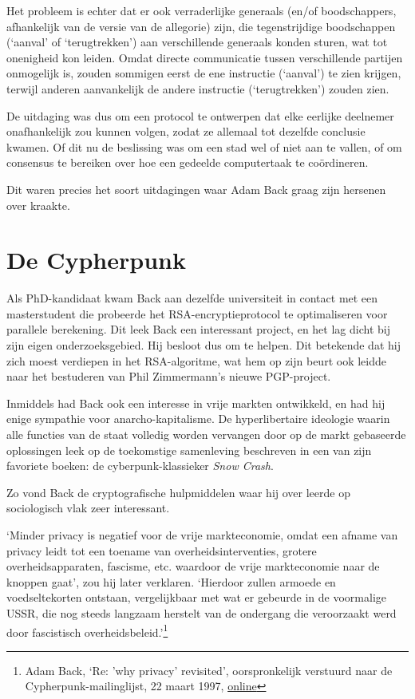 \documentclass[
  a5paper,
  smalldemyvopaper,11pt,twoside,onecolumn,openright,extrafontsizes]{memoir}
\begin{document}
Het probleem is echter dat er ook verraderlijke generaals (en/of
boodschappers, afhankelijk van de versie van de allegorie) zijn, die
tegenstrijdige boodschappen (`aanval' of `terugtrekken') aan
verschillende generaals konden sturen, wat tot onenigheid kon leiden.
Omdat directe communicatie tussen verschillende partijen onmogelijk is,
zouden sommigen eerst de ene instructie (`aanval') te zien krijgen,
terwijl anderen aanvankelijk de andere instructie (`terugtrekken')
zouden zien.

De uitdaging was dus om een protocol te ontwerpen dat elke eerlijke
deelnemer onafhankelijk zou kunnen volgen, zodat ze allemaal tot
dezelfde conclusie kwamen. Of dit nu de beslissing was om een stad wel
of niet aan te vallen, of om consensus te bereiken over hoe een gedeelde
computertaak te coördineren.

Dit waren precies het soort uitdagingen waar Adam Back graag zijn
hersenen over kraakte.

\section{De Cypherpunk}\label{de-cypherpunk}

Als PhD-kandidaat kwam Back aan dezelfde universiteit in contact met een
masterstudent die probeerde het RSA-encryptieprotocol te optimaliseren
voor parallele berekening. Dit leek Back een interessant project, en het
lag dicht bij zijn eigen onderzoeksgebied. Hij besloot dus om te helpen.
Dit betekende dat hij zich moest verdiepen in het RSA-algoritme, wat hem
op zijn beurt ook leidde naar het bestuderen van Phil Zimmermann's
nieuwe PGP-project.

Inmiddels had Back ook een interesse in vrije markten ontwikkeld, en had
hij enige sympathie voor anarcho-kapitalisme. De hyperlibertaire
ideologie waarin alle functies van de staat volledig worden vervangen
door op de markt gebaseerde oplossingen leek op de toekomstige
samenleving beschreven in een van zijn favoriete boeken: de
cyberpunk-klassieker \emph{Snow Crash}.

Zo vond Back de cryptografische hulpmiddelen waar hij over leerde op
sociologisch vlak zeer interessant.

`Minder privacy is negatief voor de vrije markteconomie, omdat een
afname van privacy leidt tot een toename van overheidsinterventies,
grotere overheidsapparaten, fascisme, etc. waardoor de vrije
markteconomie naar de knoppen gaat', zou hij later verklaren. `Hierdoor
zullen armoede en voedseltekorten ontstaan, vergelijkbaar met wat er
gebeurde in de voormalige USSR, die nog steeds langzaam herstelt van de
ondergang die veroorzaakt werd door fascistisch
overheidsbeleid.'\footnote{Adam Back, `Re: 'why privacy' revisited',
  oorspronkelijk verstuurd naar de Cypherpunk-mailinglijst, 22 maart
  1997,
  \href{https://cypherpunks.venona.com/date/1997/03/msg00586.html}{online}}
\end{document}
